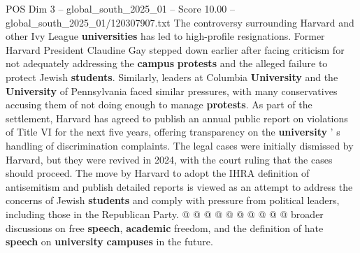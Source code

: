 \begin{textsample}{POS Dim 3 – global\_south\_2025\_01 – Score 10.00 – global\_south\_2025\_01/120307907.txt}
The controversy surrounding Harvard and other Ivy League \textbf{universities} has led to high-profile resignations.
Former Harvard President Claudine Gay stepped down earlier after facing criticism for not adequately addressing the \textbf{campus} \textbf{protests} and the alleged failure to protect Jewish \textbf{students}.
Similarly, leaders at Columbia \textbf{University} and the \textbf{University} of Pennsylvania faced similar pressures, with many conservatives accusing them of not doing enough to manage \textbf{protests}.
As part of the settlement, Harvard has agreed to publish an annual public report on violations of Title VI for the next five years, offering transparency on the \textbf{university} ' s handling of discrimination complaints.
The legal cases were initially dismissed by Harvard, but they were revived in 2024, with the court ruling that the cases should proceed.
The move by Harvard to adopt the IHRA definition of antisemitism and publish detailed reports is viewed as an attempt to address the concerns of Jewish \textbf{students} and comply with pressure from political leaders, including those in the Republican Party. @ @ @ @ @ @ @ @ @ @ broader discussions on free \textbf{speech}, \textbf{academic} freedom, and the definition of hate \textbf{speech} on \textbf{university} \textbf{campuses} in the future.

\end{textsample}
